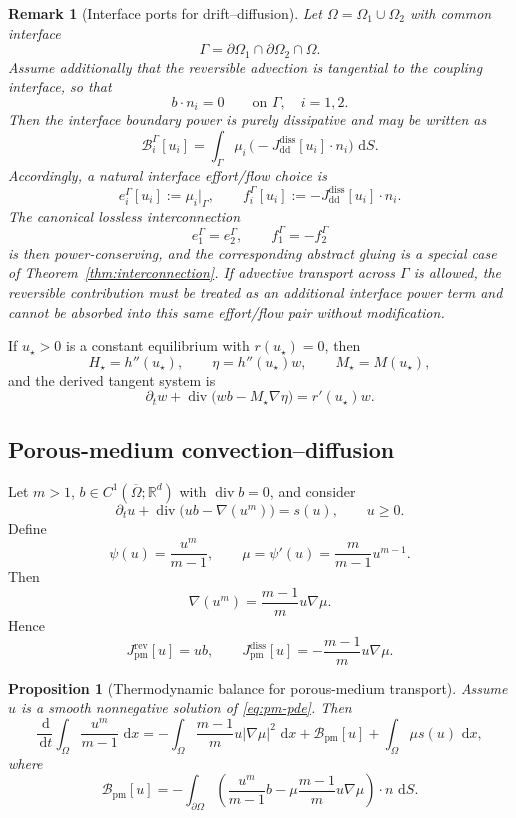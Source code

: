 \documentclass[11pt]{article}
\newtheorem{proposition}[theorem]{Proposition}
\newtheorem{remark}[theorem]{Remark}
\newcommand{\R}{\mathbb{R}}
\newcommand{\Om}{\Omega}
\newcommand{\pa}{\partial}
\newcommand{\cl}{\overline}
\newcommand{\grad}{\nabla}
\newcommand{\diver}{\operatorname{div}}
\newcommand{\dd}{\,\mathrm{d}}
\newcommand{\Bnd}{\mathcal{B}}
\begin{document}
\begin{remark}[Interface ports for drift--diffusion]
Let \(\Om=\Om_1\cup\Om_2\) with common interface
\[
\Gamma=\pa\Om_1\cap \pa\Om_2\cap\Om.
\]
Assume additionally that the reversible advection is tangential to the coupling
interface, so that
\[
b\cdot n_i = 0
\qquad \text{on }\Gamma,\quad i=1,2.
\]
Then the interface boundary power is purely dissipative and may be written as
\[
\Bnd_i^\Gamma[u_i]
=
\int_\Gamma \mu_i\,\bigl(-J_{\mathrm{dd}}^{\mathrm{diss}}[u_i]\cdot n_i\bigr)\,\dd S.
\]
Accordingly, a natural interface effort/flow choice is
\[
e_i^\Gamma[u_i] := \mu_i|_\Gamma,
\qquad
f_i^\Gamma[u_i] := -J_{\mathrm{dd}}^{\mathrm{diss}}[u_i]\cdot n_i.
\]
The canonical lossless interconnection
\[
e_1^\Gamma=e_2^\Gamma,
\qquad
f_1^\Gamma=-f_2^\Gamma
\]
is then power-conserving, and the corresponding abstract gluing is a special case of
Theorem~\ref{thm:interconnection}. If advective transport across \(\Gamma\) is
allowed, the reversible contribution must be treated as an additional interface power
term and cannot be absorbed into this same effort/flow pair without modification.
\end{remark}

If \(u_\star>0\) is a constant equilibrium with \(r(u_\star)=0\), then
\[
H_\star=h''(u_\star),\qquad \eta=h''(u_\star)w,\qquad M_\star=M(u_\star),
\]
and the derived tangent system is
\[
\partial_t w + \diver\bigl(wb - M_\star \grad \eta\bigr)=r'(u_\star)w.
\]

\subsection{Porous-medium convection--diffusion}

Let \(m>1\), \(b\in C^1(\cl{\Om};\R^d)\) with \(\diver b=0\), and consider
\begin{equation}\label{eq:pm-pde}
\partial_t u + \diver\bigl(ub - \grad(u^m)\bigr)=s(u),
\qquad u\ge 0.
\end{equation}
Define
\[
\psi(u)=\frac{u^m}{m-1},
\qquad
\mu=\psi'(u)=\frac{m}{m-1}u^{m-1}.
\]
Then
\[
\grad(u^m)=\frac{m-1}{m}u\grad \mu.
\]
Hence
\[
J_{\mathrm{pm}}^{\mathrm{rev}}[u]=ub,
\qquad
J_{\mathrm{pm}}^{\mathrm{diss}}[u]=-\frac{m-1}{m}u\grad \mu.
\]

\begin{proposition}[Thermodynamic balance for porous-medium transport]
Assume \(u\) is a smooth nonnegative solution of \eqref{eq:pm-pde}. Then
\begin{equation}\label{eq:pm-balance}
\frac{\dd}{\dd t}\int_\Om \frac{u^m}{m-1}\,\dd x
=
-\int_\Om \frac{m-1}{m}u|\grad \mu|^2\,\dd x
+\Bnd_{\mathrm{pm}}[u]
+\int_\Om \mu s(u)\,\dd x,
\end{equation}
where
\[
\Bnd_{\mathrm{pm}}[u]
=
-\int_{\pa\Om}
\left(
\frac{u^m}{m-1}b-\mu \frac{m-1}{m}u\grad \mu
\right)\cdot n\,\dd S.
\]
\end{proposition}
\end{document}
